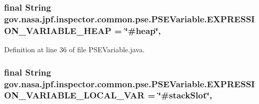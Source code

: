 \subsubsection[{\texorpdfstring{E\+X\+P\+R\+E\+S\+S\+I\+O\+N\+\_\+\+V\+A\+R\+I\+A\+B\+L\+E\+\_\+\+H\+E\+AP}{EXPRESSION_VARIABLE_HEAP}}]{\setlength{\rightskip}{0pt plus 5cm}final String gov.\+nasa.\+jpf.\+inspector.\+common.\+pse.\+P\+S\+E\+Variable.\+E\+X\+P\+R\+E\+S\+S\+I\+O\+N\+\_\+\+V\+A\+R\+I\+A\+B\+L\+E\+\_\+\+H\+E\+AP = \char`\"{}\#heap\char`\"{}\hspace{0.3cm}{\ttfamily [static]}, {\ttfamily [inherited]}}\hypertarget{classgov_1_1nasa_1_1jpf_1_1inspector_1_1common_1_1pse_1_1_p_s_e_variable_a65ca865249b5324ab8b1c93773774c49}{}\label{classgov_1_1nasa_1_1jpf_1_1inspector_1_1common_1_1pse_1_1_p_s_e_variable_a65ca865249b5324ab8b1c93773774c49}


Definition at line 36 of file P\+S\+E\+Variable.\+java.

\subsubsection[{\texorpdfstring{E\+X\+P\+R\+E\+S\+S\+I\+O\+N\+\_\+\+V\+A\+R\+I\+A\+B\+L\+E\+\_\+\+L\+O\+C\+A\+L\+\_\+\+V\+AR}{EXPRESSION_VARIABLE_LOCAL_VAR}}]{\setlength{\rightskip}{0pt plus 5cm}final String gov.\+nasa.\+jpf.\+inspector.\+common.\+pse.\+P\+S\+E\+Variable.\+E\+X\+P\+R\+E\+S\+S\+I\+O\+N\+\_\+\+V\+A\+R\+I\+A\+B\+L\+E\+\_\+\+L\+O\+C\+A\+L\+\_\+\+V\+AR = \char`\"{}\#stack\+Slot\char`\"{}\hspace{0.3cm}{\ttfamily [static]}, {\ttfamily [inherited]}}\hypertarget{classgov_1_1nasa_1_1jpf_1_1inspector_1_1common_1_1pse_1_1_p_s_e_variable_a16e15f6de4b00d41b48ba8a53907442d}{}\label{classgov_1_1nasa_1_1jpf_1_1inspector_1_1common_1_1pse_1_1_p_s_e_variable_a16e15f6de4b00d41b48ba8a53907442d}


